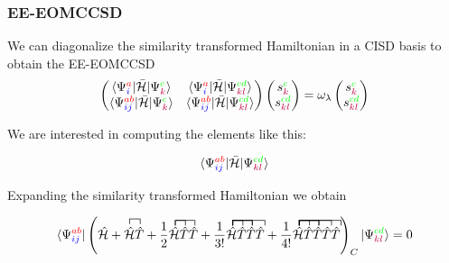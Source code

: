 \documentclass{beamer}
\begin{document}
\begin{frame}
\frametitle{EE-EOMCCSD}

\begin{footnotesize}


We can diagonalize the similarity transformed Hamiltonian in a CISD basis to obtain the EE-EOMCCSD
\[
\begin{pmatrix}
 \langle \Psi^{\textcolor{red}{a}}_{\textcolor{blue}{i}} | \bar{\mathcal{H}} |\Psi^{\textcolor{green}{c}}_{\textcolor{purple}{k}}  \rangle  &   
  \langle \Psi^{\textcolor{red}{a}}_{\textcolor{blue}{i}} | \bar{\mathcal{H}} |\Psi^{\textcolor{green}{cd}}_{\textcolor{purple}{kl}}  \rangle  
  \\ 
  \langle \Psi^{\textcolor{red}{ab}}_{\textcolor{blue}{ij}} | \bar{\mathcal{H}} |\Psi^{\textcolor{green}{c}}_{\textcolor{purple}{k}}  \rangle    & 
 \langle \Psi^{\textcolor{red}{ab}}_{\textcolor{blue}{ij}} | \bar{\mathcal{H}} |\Psi^{\textcolor{green}{cd}}_{\textcolor{purple}{kl}}  \rangle 
\end{pmatrix}
\begin{pmatrix}
s^{\textcolor{green}{c}}_{\textcolor{purple}{k}}\\
s^{\textcolor{green}{cd}}_{\textcolor{purple}{kl}}
\end{pmatrix}=\omega_{\lambda}
\begin{pmatrix}
s^{\textcolor{green}{c}}_{\textcolor{purple}{k}}\\
s^{\textcolor{green}{cd}}_{\textcolor{purple}{kl}}
\end{pmatrix}
\]

We are interested in computing the elements like this:


\[
 \langle \Psi^{\textcolor{red}{ab}}_{\textcolor{blue}{ij}} | \bar{\mathcal{H}} |\Psi^{\textcolor{green}{cd}}_{\textcolor{purple}{kl}}  \rangle 
\]

Expanding the similarity transformed Hamiltonian we obtain


\[
\langle \Psi^{\textcolor{red}{ab}}_{\textcolor{blue}{ij}} |  \left(
 \hat{\mathcal{H}} +   \contraction{} { \hat{\mathcal{H}}}{}{ {\hat{T}}} 
  \hat{\mathcal{H}} \hat{T} + 
 \frac{1}{2}\contraction{}{ \bar{11}}{}{\bar{1}} 
    \contraction{} { \bar{11}}{1}{ {\hat{11}}} 
 \hat{\mathcal{H}} \hat{T} \hat{T}  +
\frac{1}{3!}  \contraction{}{ \bar{11}}{}{\bar{1}} 
    \contraction{} { \bar{11}}{1}{ {\hat{11}}} 
 \contraction{} { \bar{11}}{1}{ {\hat{11}}}
 \contraction{} { \bar{11}}{1}{ {\hat{111111}}}
\hat{\mathcal{H}} \hat{T} \hat{T} \hat{T}  +
\frac{1}{4!}  \contraction{}{ \bar{11}}{}{\bar{1}} 
    \contraction{} { \bar{11}}{1}{ {\hat{11}}} 
 \contraction{} { \bar{11}}{1}{ {\hat{11}}}
 \contraction{} { \bar{11}}{1}{ {\hat{111111}}}
 \contraction{} { \bar{11}}{1}{ {\hat{111111111}}}
\hat{\mathcal{H}} \hat{T} \hat{T} \hat{T}  \hat{T} 
 \right)_{C}|\Psi^{\textcolor{green}{cd}}_{\textcolor{purple}{kl}}  \rangle = 0
\]


\end{footnotesize}
\end{frame}
\end{document}
